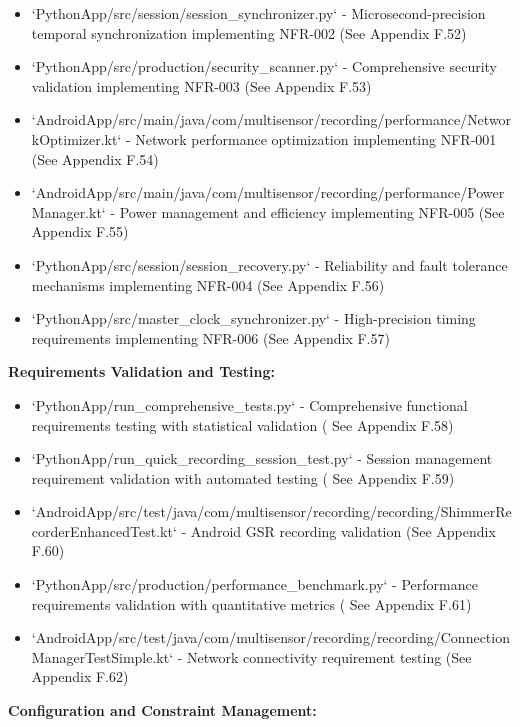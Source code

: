 \documentclass[12pt,a4paper]{report}
\begin{document}
\begin{itemize}
\item `PythonApp/src/session/session_synchronizer.py` - Microsecond-precision temporal synchronization implementing
  NFR-002 (See Appendix F.52)
\item `PythonApp/src/production/security_scanner.py` - Comprehensive security validation implementing NFR-003 (See Appendix
  F.53)
\item `AndroidApp/src/main/java/com/multisensor/recording/performance/NetworkOptimizer.kt` - Network performance
  optimization implementing NFR-001 (See Appendix F.54)
\item `AndroidApp/src/main/java/com/multisensor/recording/performance/PowerManager.kt` - Power management and efficiency
  implementing NFR-005 (See Appendix F.55)
\item `PythonApp/src/session/session_recovery.py` - Reliability and fault tolerance mechanisms implementing NFR-004 (See
  Appendix F.56)
\item `PythonApp/src/master_clock_synchronizer.py` - High-precision timing requirements implementing NFR-006 (See Appendix
  F.57)

\end{itemize}
\textbf{Requirements Validation and Testing:}

\begin{itemize}
\item `PythonApp/run_comprehensive_tests.py` - Comprehensive functional requirements testing with statistical validation (
  See Appendix F.58)
\item `PythonApp/run_quick_recording_session_test.py` - Session management requirement validation with automated testing (
  See Appendix F.59)
\item `AndroidApp/src/test/java/com/multisensor/recording/recording/ShimmerRecorderEnhancedTest.kt` - Android GSR recording
  validation (See Appendix F.60)
\item `PythonApp/src/production/performance_benchmark.py` - Performance requirements validation with quantitative metrics (
  See Appendix F.61)
\item `AndroidApp/src/test/java/com/multisensor/recording/recording/ConnectionManagerTestSimple.kt` - Network connectivity
  requirement testing (See Appendix F.62)

\end{itemize}
\textbf{Configuration and Constraint Management:}
\end{document}
